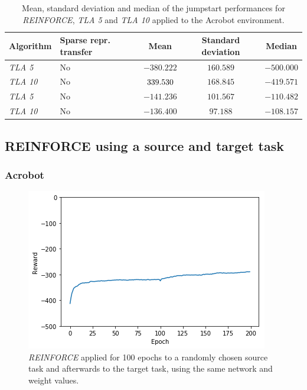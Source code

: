 \begin{table}[htb]
    \centering
    \begin{tabular}{llccc}
    \hline
    Algorithm & Sparse repr. transfer & Mean & Standard deviation & Median \\
    \hline
       \textit{TLA 5} & No & $-380.222$ & $160.589$ & $-500.000$ \\
       \textit{TLA 10} & No & $\-339.530$ & $168.845$ & $\bm{-419.571}$ \\
       \textit{TLA 5} & No & $-141.236$ & $101.567$ & $-110.482$ \\
       \textit{TLA 10} & No & $\bm{-136.400}$ & $97.188$ & $\bm{-108.157}$ \\
    \hline
    \end{tabular}
    \caption{Mean, standard deviation and median of the jumpstart performances for \textit{REINFORCE}, \textit{TLA 5} and \textit{TLA 10} applied to the Acrobot environment.}
    \label{tab:acrobot:sparse:stats}
\end{table}

\subsection{REINFORCE using a source and target task} %
\label{sub:reinforce_using_a_source_and_target_task}
\subsubsection{Acrobot} %
\label{ssub:reinforce_source_target:acrobot}
\begin{figure}[htb]
    \centering
    \includegraphics[width=.8\linewidth]{images/results/Acrobot/reinforce_2tasks.png}
    \caption{\textit{REINFORCE} applied for 100 epochs to a randomly chosen source task and afterwards to the target task, using the same network and weight values.}
    \label{fig:Acrobot:reward_reinforce_2tasks}
\end{figure}
